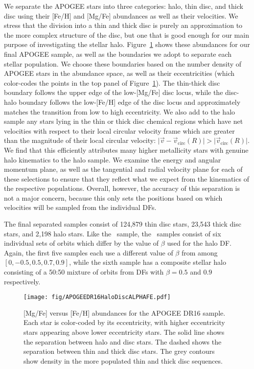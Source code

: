 We separate the APOGEE stars into three categories: halo, thin disc, and thick disc using their [Fe/H] and [Mg/Fe] abundances as well as their velocities. We stress that the division into a thin and thick disc is purely an approximation to the more complex structure of the disc, but one that is good enough for our main purpose of investigating the stellar halo. Figure~\ref{fig:APOGEEAbundances} shows these abundances for our final APOGEE sample, as well as the boundaries we adopt to separate each stellar population. We choose these boundaries based on the number density of APOGEE stars in the abundance space, as well as their eccentricities (which color-codes the points in the top panel of Figure~\ref{fig:APOGEEAbundances}). The thin-thick disc boundary follows the upper edge of the low-[Mg/Fe] disc locus, while the disc-halo boundary follows the low-[Fe/H] edge of the disc locus and approximately matches the transition from low to high eccentricity. We also add to the halo sample any stars lying in the thin or thick disc chemical regions which have net velocities with respect to their local circular velocity frame which are greater than the magnitude of their local circular velocity: $\lvert \vec{v} - \vec{v}_\mathrm{circ}(R) \rvert > \lvert \vec{v}_\mathrm{circ}(R) \rvert $. We find that this efficiently attributes many higher metallicity stars with genuine halo kinematics to the halo sample. We examine the energy and angular momentum plane, as well as the tangential and radial velocity plane for each of these selections to ensure that they reflect what we expect from the kinematics of the respective populations. Overall, however, the accuracy of this separation is not a major concern, because this only sets the positions based on which velocities will be sampled from the individual DFs. 

The final separated samples consist of 124,879 thin disc stars, 23,543 thick disc stars, and 2,198 halo stars. Like the \solar\ sample, the \survey\ samples consist of six individual sets of orbits which differ by the value of $\beta$ used for the halo DF. Again, the first five samples each use a different value of $\beta$ from among $[0,-0.5,0.5,0.7,0.9]$, while the sixth sample has a composite stellar halo consisting of a 50:50 mixture of orbits from DFs with $\beta=0.5$ and $0.9$ respectively.

\begin{figure}
	\centering
	\texttt{[image: fig/APOGEEDR16HaloDiscALPHAFE.pdf]}
	\caption{[Mg/Fe] versus [Fe/H] abundances for the APOGEE DR16 sample. Each star is color-coded by its eccentricity, with higher eccentricity stars appearing above lower eccentricity stars. The solid line shows the separation between halo and disc stars. The dashed shows the separation between thin and thick disc stars. The grey contours show density in the more populated thin and thick disc sequences.}
	\label{fig:APOGEEAbundances}
\end{figure}

